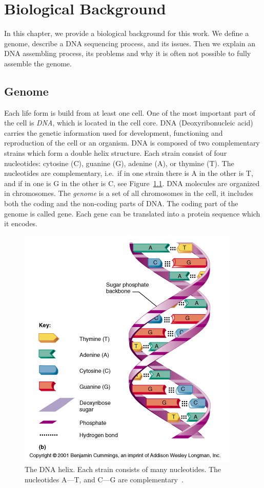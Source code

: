 \chapter{Biological Background}\label{chap:biointro}

In this chapter, we provide a biological background for this work.
We define a genome, describe a DNA sequencing process, and its issues. Then we explain an DNA assembling process, its problems and why it is often not possible to fully assemble the genome.

\section{Genome}

Each life form is build from at least one cell. One of the most important part of the cell is \emph{DNA}, which is located in the cell core.
DNA (Deoxyribonucleic acid) carries the genetic information used for development, functioning and reproduction of the cell or an organism.
DNA is composed of two complementary strains which form a double helix structure. Each strain consist of four nucleotides: cytosine (C), guanine (G), adenine (A), or thymine (T).
The nucleotides are complementary, i.e.\ if in one strain there is A in the other is T, and if in one is G in the other is C, see Figure~\ref{fig:dnahelix}.
DNA molecules are organized in chromosomes.
The \emph{genome} is a set of all chromosomes in the cell, it includes both the coding and the non-coding parts of DNA.\@
The coding part of the genome is called gene. Each gene can be translated into a protein sequence which it encodes.

\begin{figure}[htbp]
  \centering
  \includegraphics[width=.5\textwidth]{../figures/dna-helix}
  \caption[DNA helix]{The DNA helix. Each strain consists of many nucleotides. The nucleotides A---T, and C---G are complementary~\cite{dnahelix}.}\label{fig:dnahelix}
\end{figure}

